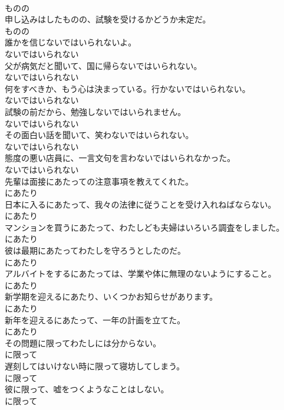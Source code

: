 \documentclass[8pt]{extreport}
\begin{document}
\begin{CJK}{UTF8}{min}
\\	ものの
\\	申し込みはしたものの、試験を受けるかどうか未定だ。	
\\	ものの
\\	誰かを信じないではいられないよ。	
\\	ないではいられない
\\	父が病気だと聞いて、国に帰らないではいられない。	
\\	ないではいられない
\\	何をすべきか、もう心は決まっている。行かないではいられない。	
\\	ないではいられない
\\	試験の前だから、勉強しないではいられません。	
\\	ないではいられない
\\	その面白い話を聞いて、笑わないではいられない。	
\\	ないではいられない
\\	態度の悪い店員に、一言文句を言わないではいられなかった。	
\\	ないではいられない
\\	先輩は面接にあたっての注意事項を教えてくれた。	
\\	にあたり
\\	日本に入るにあたって、我々の法律に従うことを受け入れねばならない。	
\\	にあたり
\\	マンションを買うにあたって、わたしども夫婦はいろいろ調査をしました。	
\\	にあたり
\\	彼は最期にあたってわたしを守ろうとしたのだ。	
\\	にあたり
\\	アルバイトをするにあたっては、学業や体に無理のないようにすること。	
\\	にあたり
\\	新学期を迎えるにあたり、いくつかお知らせがあります。	
\\	にあたり
\\	新年を迎えるにあたって、一年の計画を立てた。	
\\	にあたり
\\	その問題に限ってわたしには分からない。	
\\	に限って
\\	遅刻してはいけない時に限って寝坊してしまう。	
\\	に限って
\\	彼に限って、嘘をつくようなことはしない。	
\\	に限って

\end{CJK}
\end{document}
